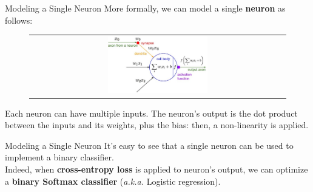 \documentclass[aspectratio=169]{beamer}
\begin{document}

\begin{frame}{Modeling a Single Neuron}
More formally, we can model a single \textbf{neuron} as follows:
\begin{figure}
\begin{tabular}{c}
\includegraphics[width=0.4\textwidth]{img/dnn/single_neuron.jpg}
\end{tabular}
\end{figure}
Each neuron can have multiple inputs. The neuron's output is the dot product between the inputs and its weights, plus the bias: then, a non-linearity is applied.
\end{frame}


\begin{frame}{Modeling a Single Neuron}
It's easy to see that a single neuron can be used to implement a binary classifier.\\
\vspace{1cm}
Indeed, when \textbf{cross-entropy loss} is applied to neuron's output, we can optimize a \textbf{binary Softmax classifier} (\emph{a.k.a.} Logistic regression).
\end{frame}


\end{document}
